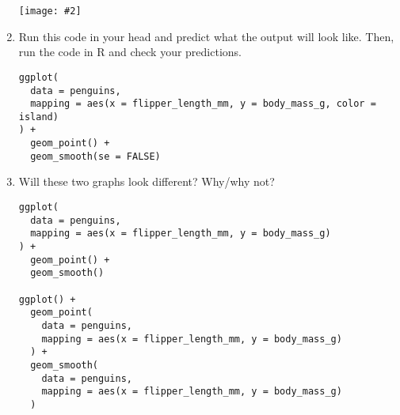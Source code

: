 \documentclass[12pt]{article}
\newcommand{\fig}[2]{\centerline{\texttt{[image: \#2]}}}
\begin{document}
\begin{enumerate}
\fig{1}{unnamed-chunk-17-1.png}


\item Run this code in your head and predict what the output will look like. Then, run the code in R and check your predictions.
\begin{verbatim}
ggplot(
  data = penguins,
  mapping = aes(x = flipper_length_mm, y = body_mass_g, color = island)
) +
  geom_point() +
  geom_smooth(se = FALSE)
  \end{verbatim}
  
  \item Will these two graphs look different? Why/why not?

\begin{verbatim}
ggplot(
  data = penguins,
  mapping = aes(x = flipper_length_mm, y = body_mass_g)
) +
  geom_point() +
  geom_smooth()

ggplot() +
  geom_point(
    data = penguins,
    mapping = aes(x = flipper_length_mm, y = body_mass_g)
  ) +
  geom_smooth(
    data = penguins,
    mapping = aes(x = flipper_length_mm, y = body_mass_g)
  )
\end{verbatim}

\end{enumerate}
\end{document}
